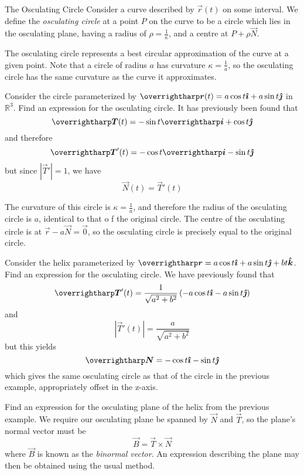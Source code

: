 \documentclass[../main.tex]{subfiles}
\begin{document}
        \begin{definition}{The Osculating Circle}{}
                Consider a curve described by \(\vec{r}(t)\) on some interval. We define the \emph{osculating circle} at a point \(P\) on the curve to be a circle which lies in the osculating plane, having a radius of \(\rho=\frac{1}{\kappa}\), and a centre at \(P+\rho\vec{N}\).
        \end{definition}
        The osculating circle represents a best circular approximation of the curve at a given point. Note that a circle of radius \(a\) has curvature \(\kappa=\frac{1}{a}\), so the osculating circle has the same curvature as the curve it approximates.
        \begin{example}{}{}
                Consider the circle parameterized by \(\vec{r}(t)=a\cos{t}\i+a\sin{t}\j\) in \(\mathbb{R}^3\). Find an expression for the osculating  circle.
                \tcblower
                It has previously been found that
                \[
                \vec{T}(t)=-\sin{t}\vec{i}+\cos{t}\j
                \]
                and therefore
                \[
                \vec{T}'(t)=-\cos{t}\vec{i}-\sin{t}\j
                \]
                but since \(|\vec{T}'|=1\), we have
                \[
                \vec{N}(t)=\vec{T}'(t)
                \]

                The curvature of this circle is \(\kappa=\frac{1}{a}\), and therefore the radius of the osculating circle is \(a\), identical to that o f the original circle. The centre of the osculating circle is at \(\vec{r}-a\vec{N}=\vec{0}\), so the osculating circle is precisely equal to the original circle.
        \end{example}
        \begin{example}{}{}
                Consider the helix parameterized by \(\vec{r}=a\cos{t}\i+a\sin{t}\j+bt\k\). Find an expression for the osculating circle.
                \tcblower
                We have previously found that
                \[
                \vec{T}'(t)=\frac{1}{\sqrt{a^2+b^2}}\left(-a\cos{t}\i-a\sin{t}\j\right)
                \]
                and
                \[
                |\vec{T}'(t)|=\frac{a}{\sqrt{a^2+b^2}}
                \]
                but this yields
                \[
                \vec{N}=-\cos{t}\i-\sin{t}\j
                \]
                which gives the same osculating circle as that of the circle in the previous example, appropriately offset in the z-axis.
        \end{example}
        \begin{example}{}{}
                Find an expression for the osculating plane of the helix from the previous example. 
                \tcblower
                We require our osculating plane be spanned by \(\vec{N}\) and \(\vec{T}\), so the plane's normal vector must be
                \[
                \vec{B}=\vec{T}\times\vec{N}
                \]
                where \(\vec{B}\) is known as the \emph{binormal vector}.
                An expression describing the plane may then be obtained using the usual method.
        \end{example}
\end{document}
